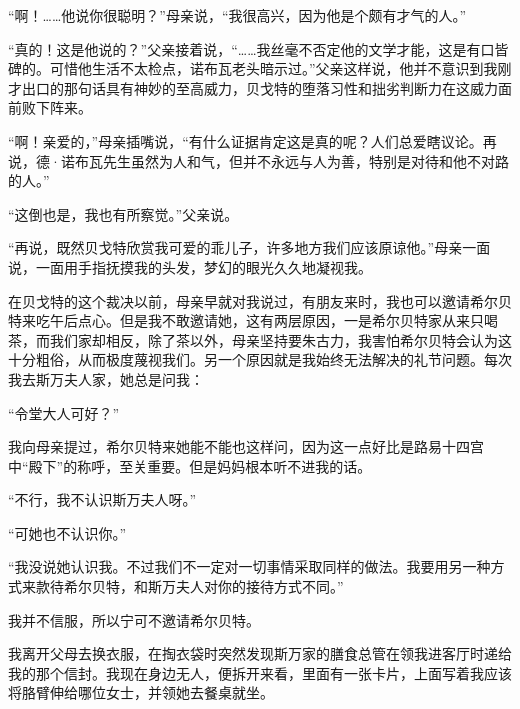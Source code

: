 \par “啊！……他说你很聪明？”母亲说，“我很高兴，因为他是个颇有才气的人。”
\par “真的！这是他说的？”父亲接着说，“……我丝毫不否定他的文学才能，这是有口皆碑的。可惜他生活不太检点，诺布瓦老头暗示过。”父亲这样说，他并不意识到我刚才出口的那句话具有神妙的至高威力，贝戈特的堕落习性和拙劣判断力在这威力面前败下阵来。
\par “啊！亲爱的，”母亲插嘴说，“有什么证据肯定这是真的呢？人们总爱瞎议论。再说，德·诺布瓦先生虽然为人和气，但并不永远与人为善，特别是对待和他不对路的人。”
\par “这倒也是，我也有所察觉。”父亲说。
\par “再说，既然贝戈特欣赏我可爱的乖儿子，许多地方我们应该原谅他。”母亲一面说，一面用手指抚摸我的头发，梦幻的眼光久久地凝视我。
\par 在贝戈特的这个裁决以前，母亲早就对我说过，有朋友来时，我也可以邀请希尔贝特来吃午后点心。但是我不敢邀请她，这有两层原因，一是希尔贝特家从来只喝茶，而我们家却相反，除了茶以外，母亲坚持要朱古力，我害怕希尔贝特会认为这十分粗俗，从而极度蔑视我们。另一个原因就是我始终无法解决的礼节问题。每次我去斯万夫人家，她总是问我：
\par “令堂大人可好？”
\par 我向母亲提过，希尔贝特来她能不能也这样问，因为这一点好比是路易十四宫中“殿下”的称呼，至关重要。但是妈妈根本听不进我的话。
\par “不行，我不认识斯万夫人呀。”
\par “可她也不认识你。”
\par “我没说她认识我。不过我们不一定对一切事情采取同样的做法。我要用另一种方式来款待希尔贝特，和斯万夫人对你的接待方式不同。”
\par 我并不信服，所以宁可不邀请希尔贝特。
\par 我离开父母去换衣服，在掏衣袋时突然发现斯万家的膳食总管在领我进客厅时递给我的那个信封。我现在身边无人，便拆开来看，里面有一张卡片，上面写着我应该将胳臂伸给哪位女士，并领她去餐桌就坐。
